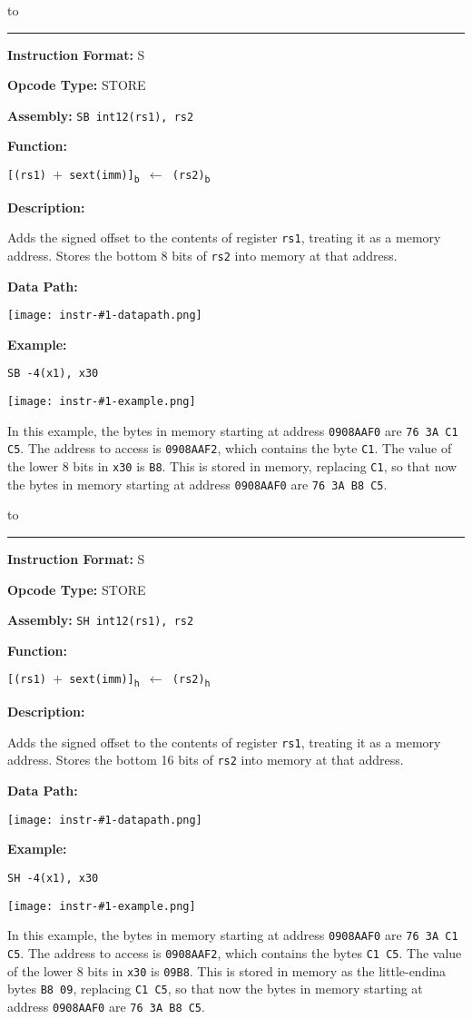 \documentclass[11pt,twoside,letterpaper,titlepage]{report}
\newcommand{\minipagerestore}{
    \setlength{\parindent}{0pt}
    \setlength{\parskip}{0.5\baselineskip}
}
\newenvironment{instrheader}[5]
{%
\hbox to \textwidth{{\huge\textbf{#1}} \hfil {\Large #2}}
\rule{\textwidth}{0.4pt}

\par
\begin{minipage}{0.5\textwidth}
\textbf{Instruction Format:} #3
\end{minipage}
\begin{minipage}{0.45\textwidth}
\textbf{Opcode Type:} #4
\end{minipage}
\vspace*{0.5\baselineskip}

\par
\textbf{Assembly:} \texttt{#5}
\vspace*{0.5\baselineskip}
\ignorespacesafterend
}
{%
}
\newenvironment{instrfunction}
{%
\par
\textbf{Function:} %
}
{%
\vspace*{0.5\baselineskip}
\ignorespacesafterend
}
\newenvironment{instrdesc}
{%
\par
\textbf{Description:}
\vspace*{0.2\baselineskip}
\par
\hfill\begin{minipage}{\dimexpr\textwidth-1em}\minipagerestore
}
{%
\end{minipage}
\vspace*{\baselineskip}
\ignorespacesafterend
}
\newcommand{\instrdatapathimg}[1]{
\par
\textbf{Data Path:}
\begin{center}
\texttt{[image: instr-\#1-datapath.png]}
\end{center}
}
\newenvironment{instrexample}
{%
\par
\textbf{Example:} %
}
{%
}
\newenvironment{instrexamplenotes}
{%
\vspace*{0.3\baselineskip}
\par
\hfill\begin{minipage}{\dimexpr\textwidth-1em}\minipagerestore
}
{%
\end{minipage}
}
\newcommand{\instrexampleimg}[1]{
\par
\begin{center}
\texttt{[image: instr-\#1-example.png]}
\end{center}    
\vspace*{0.5\baselineskip}
}
\begin{document}
\begin{instrheader}{SB}{Store byte}{S}{STORE}{SB int12(rs1), rs2}
\end{instrheader}
\begin{instrfunction}
    \texttt{[(rs1) $+$ sext(imm)]\textsubscript{b} $\leftarrow$ (rs2)\textsubscript{b}}
\end{instrfunction}
\begin{instrdesc}
    Adds the signed offset to the contents of register \texttt{rs1}, treating it as
    a memory address. Stores the bottom 8 bits of \texttt{rs2} into memory at that address.
\end{instrdesc}
\instrdatapathimg{sb}
\begin{instrexample}
    \texttt{SB -4(x1), x30}
\end{instrexample}
\instrexampleimg{sb}
\begin{instrexamplenotes}
    In this example, the bytes in memory starting at address \texttt{0908AAF0} are 
    \texttt{76 3A C1 C5}. The address to access is \texttt{0908AAF2}, which contains the 
    byte \texttt{C1}. The value of the lower 8 bits in \texttt{x30} is \texttt{B8}. This
    is stored in memory, replacing \texttt{C1}, so that now the bytes in memory starting
    at address \texttt{0908AAF0} are \texttt{76 3A B8 C5}. 
\end{instrexamplenotes}
\newpage

\begin{instrheader}{SH}{Store half word}{S}{STORE}{SH int12(rs1), rs2}
\end{instrheader}
\begin{instrfunction}
    \texttt{[(rs1) $+$ sext(imm)]\textsubscript{h} $\leftarrow$ (rs2)\textsubscript{h}}
\end{instrfunction}
\begin{instrdesc}
    Adds the signed offset to the contents of register \texttt{rs1}, treating it as
    a memory address. Stores the bottom 16 bits of \texttt{rs2} into memory at that address.
\end{instrdesc}
\instrdatapathimg{sh}
\begin{instrexample}
    \texttt{SH -4(x1), x30}
\end{instrexample}
\instrexampleimg{sh}
\begin{instrexamplenotes}
    In this example, the bytes in memory starting at address \texttt{0908AAF0} are 
    \texttt{76 3A C1 C5}. The address to access is \texttt{0908AAF2}, which contains the 
    bytes \texttt{C1 C5}. The value of the lower 8 bits in \texttt{x30} is \texttt{09B8}. This
    is stored in memory as the little-endina bytes \texttt{B8 09}, replacing \texttt{C1 C5}, so 
    that now the bytes in memory starting at address \texttt{0908AAF0} are \texttt{76 3A B8 C5}. 
\end{instrexamplenotes}
\newpage
\end{document}
